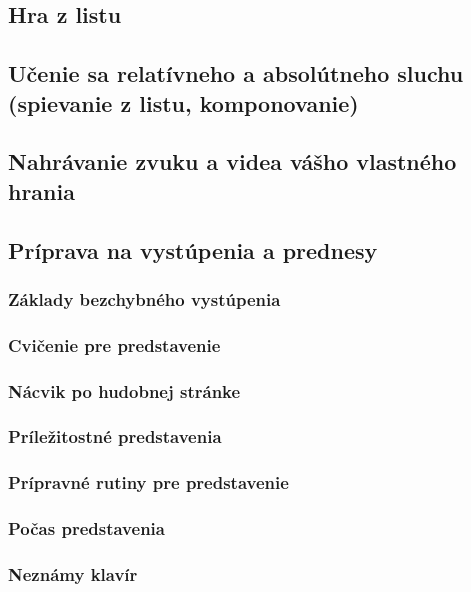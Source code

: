 \subsection{Hra z listu}

\subsection{Učenie sa relatívneho a absolútneho sluchu (spievanie z listu, komponovanie)}

\subsection{Nahrávanie zvuku a videa vášho vlastného hrania}

\subsection{Príprava na vystúpenia a prednesy}

\subsubsection{Základy bezchybného vystúpenia}

\subsubsection{Cvičenie pre predstavenie}

\subsubsection{Nácvik po hudobnej stránke}

\subsubsection{Príležitostné predstavenia}

\subsubsection{Prípravné rutiny pre predstavenie}

\subsubsection{Počas predstavenia}

\subsubsection{Neznámy klavír}

